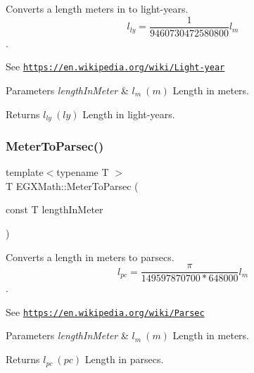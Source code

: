 Converts a length meters in to light-\/years. \[ l_{ly}= \frac{1}{9460730472580800} l_{m} \]. 

See \href{https://en.wikipedia.org/wiki/Light-year}{\tt https\+://en.\+wikipedia.\+org/wiki/\+Light-\/year} 
\begin{DoxyParams}{Parameters}
{\em length\+In\+Meter} & $ l_{m}\ (m)$ Length in meters. \\
\hline
\end{DoxyParams}
\begin{DoxyReturn}{Returns}
$ l_{ly}\ (ly)$ Length in light-\/years. 
\end{DoxyReturn}
\mbox{\label{group___e_g_x_math-_conversions-_length_conversions-_meter-_astronomical_ga326ca8b69fece7b50052e3f319d5ce5a}} 
\subsubsection{\texorpdfstring{Meter\+To\+Parsec()}{MeterToParsec()}}
{\footnotesize\ttfamily template$<$typename T $>$ \\
T E\+G\+X\+Math\+::\+Meter\+To\+Parsec (\begin{DoxyParamCaption}\item[{const T}]{length\+In\+Meter }\end{DoxyParamCaption})}



Converts a length in meters to parsecs. \[ l_{pc}=\frac{\pi}{149597870700 * 648000} l_{m} \]. 

See \href{https://en.wikipedia.org/wiki/Parsec}{\tt https\+://en.\+wikipedia.\+org/wiki/\+Parsec} 
\begin{DoxyParams}{Parameters}
{\em length\+In\+Meter} & $ l_{m}\ (m)$ Length in meters. \\
\hline
\end{DoxyParams}
\begin{DoxyReturn}{Returns}
$ l_{pc}\ (pc)$ Length in parsecs. 
\end{DoxyReturn}
